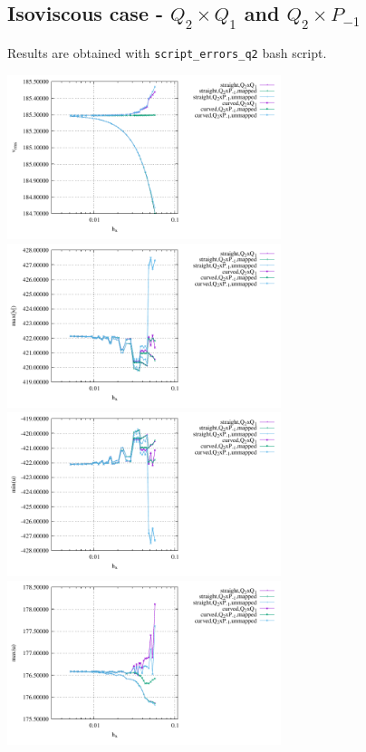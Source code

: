\newpage
\subsection*{Isoviscous case - $Q_2\times Q_1$ and $Q_2\times P_{-1}$}

Results are obtained with {\tt script\_errors\_q2} bash script.

\begin{center}
\includegraphics[width=8cm]{python_codes/fieldstone_25/results/isoviscous/vrms.pdf}
\includegraphics[width=8cm]{python_codes/fieldstone_25/results/isoviscous/max_vel.pdf}\\
\includegraphics[width=8cm]{python_codes/fieldstone_25/results/isoviscous/min_u.pdf}
\includegraphics[width=8cm]{python_codes/fieldstone_25/results/isoviscous/max_u.pdf}\\

\end{center}
